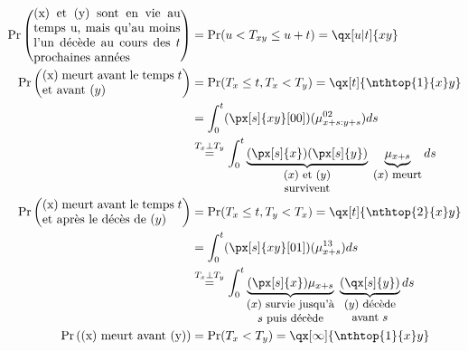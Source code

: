 \documentclass[10pt, french]{article}
\begin{document}
\begin{multicols*}{2}
	\setlength{\mathindent}{-1cm}
\begin{align*}
	\Pr\left(\parbox[1cm]{4.2cm}{(x) et (y) sont en vie au temps u, mais qu'au moins l'un décède au cours des $t$ prochaines années}\right)
		&=	\Pr(u	<	T_{xy}	\leq		u + t)	
		=	\qx[u | t]{xy}	\\
	\Pr\left(\parbox[1cm]{4cm}{(x) meurt avant le temps $t$\\ et avant $(y)$}\right)	
		&=	\Pr(T_{x}	\leq		t, T_{x}	<	T_{y})	
		=	\qx[t]{\nthtop{1}{x}y}	\\
		&=	\int_{0}^{t} (\px[s]{xy}[00])(\mu_{x + s : y + s}^{02})ds	\\
	&\overset{T_{x}	\perp	T_{y}}{=}	\int_{0}^{t}\underbrace{(\px[s]{x})(\px[s]{y})}_{\small\shortstack{$(x)$ et $(y)$\\ survivent}} \; \underbrace{\mu_{x + s}}_{\small\shortstack{$(x)$ meurt}}ds 	\\
	\Pr\left(\parbox[1cm]{4cm}{(x) meurt avant le temps $t$\\ et après le décès de $(y)$}\right)	
		&=	\Pr(T_{x}	\leq		t, T_{y}	<	T_{x})	
		=	\qx[t]{\nthtop{2}{x}y}	\\
		&=	\int_{0}^{t} (\px[s]{xy}[01])(\mu_{x + s}^{13})ds	\\
		&\overset{T_{x}	\perp	T_{y}}{=}	\int_{0}^{t}\underbrace{(\px[s]{x})\mu_{x + s}}_{\small\shortstack{$(x)$ survie jusqu'à\\ $s$ puis décède}} \; \underbrace{(\qx[s]{y})}_{\small\shortstack{$(y)$ décède\\ avant $s$}}ds	\\
	\Pr\left(\shortstack{(x) meurt avant (y)}\right)	
		&=	\Pr(T_{x}	<	T_{y})	
		=	\qx[\infty]{\nthtop{1}{x}y}	
\end{align*}
	\setlength{\mathindent}{1cm}


\end{multicols*}
\end{document}
